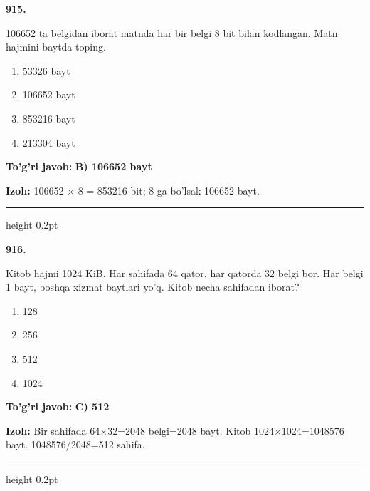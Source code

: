 \documentclass[10pt,a4paper,oneside]{article}
\begin{document}
\noindent\textbf{\color{ink}915.}
\par
106652 ta belgidan iborat matnda har bir belgi 8 bit bilan kodlangan. Matn hajmini baytda toping.
\begin{enumerate}[label=\Alph*),leftmargin=9mm]
\item 53326 bayt
\item 106652 bayt
\item 853216 bayt
\item 213304 bayt
\end{enumerate}
\begin{tcolorbox}[enhanced,breakable,colback=teal!4,colframe=teal!50!black,boxrule=0.5pt,arc=1.1mm,left=3mm,right=3mm,top=1.7mm,bottom=1.7mm,before skip=2mm,after skip=2mm]
\textbf{\color{teal}To'g'ri javob:} \textbf{B) 106652 bayt}
\par\smallskip
\textbf{Izoh:} 106652 \ensuremath{\times} 8 = 853216 bit; 8 ga bo'lsak 106652 bayt.
\end{tcolorbox}
\vspace{2mm}\hrule height 0.2pt \vspace{3mm}

\noindent\textbf{\color{ink}916.}
\par
Kitob hajmi 1024 KiB. Har sahifada 64 qator, har qatorda 32 belgi bor. Har belgi 1 bayt, boshqa xizmat baytlari yo'q. Kitob necha sahifadan iborat?
\begin{enumerate}[label=\Alph*),leftmargin=9mm]
\item 128
\item 256
\item 512
\item 1024
\end{enumerate}
\begin{tcolorbox}[enhanced,breakable,colback=teal!4,colframe=teal!50!black,boxrule=0.5pt,arc=1.1mm,left=3mm,right=3mm,top=1.7mm,bottom=1.7mm,before skip=2mm,after skip=2mm]
\textbf{\color{teal}To'g'ri javob:} \textbf{C) 512}
\par\smallskip
\textbf{Izoh:} Bir sahifada 64\ensuremath{\times}32=2048 belgi=2048 bayt. Kitob 1024\ensuremath{\times}1024=1048576 bayt. 1048576/2048=512 sahifa.
\end{tcolorbox}
\vspace{2mm}\hrule height 0.2pt \vspace{3mm}
\end{document}
